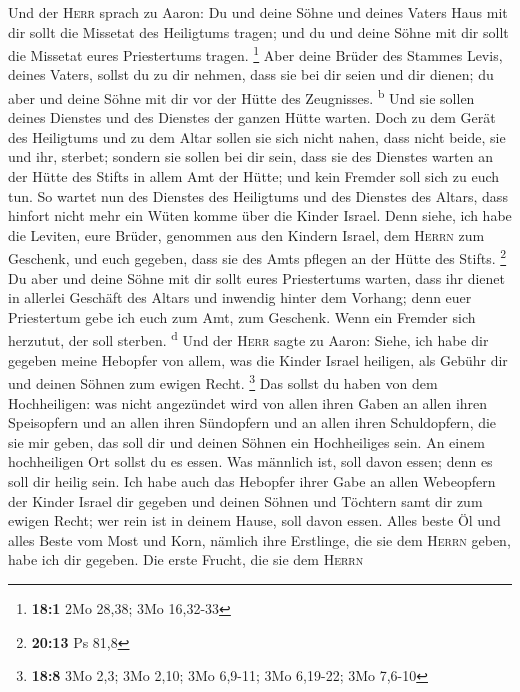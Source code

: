  Und der \textsc{Herr} sprach zu Aaron: Du und deine Söhne
und deines Vaters Haus mit dir sollt die Missetat des Heiligtums tragen;
und du und deine Söhne mit dir sollt die Missetat eures Priestertums
tragen. \footnote{\textbf{18:1} 2Mo 28,38; 3Mo 16,32-33} 
Aber deine Brüder des Stammes Levis, deines Vaters, sollst du zu dir
nehmen, dass sie bei dir seien und dir dienen; du aber und deine Söhne
mit dir vor der Hütte des Zeugnisses. \textsuperscript{b} 
Und sie sollen deines Dienstes und des Dienstes der ganzen Hütte warten.
Doch zu dem Gerät des Heiligtums und zu dem Altar sollen sie sich nicht
nahen, dass nicht beide, sie und ihr, sterbet;  sondern
sie sollen bei dir sein, dass sie des Dienstes warten an der Hütte des
Stifts in allem Amt der Hütte; und kein Fremder soll sich zu euch tun.
 So wartet nun des Dienstes des Heiligtums und des
Dienstes des Altars, dass hinfort nicht mehr ein Wüten komme über die
Kinder Israel.  Denn siehe, ich habe die Leviten, eure
Brüder, genommen aus den Kindern Israel, dem \textsc{Herrn} zum
Geschenk, und euch gegeben, dass sie des Amts pflegen an der Hütte des
Stifts. \footnote{\textbf{20:13} Ps 81,8}  Du aber und
deine Söhne mit dir sollt eures Priestertums warten, dass ihr dienet in
allerlei Geschäft des Altars und inwendig hinter dem Vorhang; denn euer
Priestertum gebe ich euch zum Amt, zum Geschenk. Wenn ein Fremder sich
herzutut, der soll sterben. \textsuperscript{d}  Und der
\textsc{Herr} sagte zu Aaron: Siehe, ich habe dir gegeben meine Hebopfer
von allem, was die Kinder Israel heiligen, als Gebühr dir und deinen
Söhnen zum ewigen Recht. \footnote{\textbf{18:8} 3Mo 2,3; 3Mo 2,10; 3Mo
  6,9-11; 3Mo 6,19-22; 3Mo 7,6-10}  Das sollst du haben
von dem Hochheiligen: was nicht angezündet wird von allen ihren Gaben an
allen ihren Speisopfern und an allen ihren Sündopfern und an allen ihren
Schuldopfern, die sie mir geben, das soll dir und deinen Söhnen ein
Hochheiliges sein.  An einem hochheiligen Ort sollst du
es essen. Was männlich ist, soll davon essen; denn es soll dir heilig
sein.  Ich habe auch das Hebopfer ihrer Gabe an allen
Webeopfern der Kinder Israel dir gegeben und deinen Söhnen und Töchtern
samt dir zum ewigen Recht; wer rein ist in deinem Hause, soll davon
essen.  Alles beste Öl und alles Beste vom Most und Korn,
nämlich ihre Erstlinge, die sie dem \textsc{Herrn} geben, habe ich dir
gegeben.  Die erste Frucht, die sie dem \textsc{Herrn}
